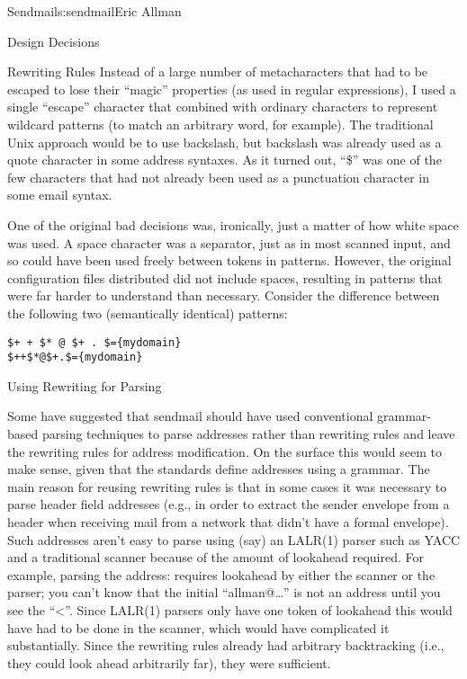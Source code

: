\begin{aosachapter}{Sendmail}{s:sendmail}{Eric Allman}
\begin{aosasect1}{Design Decisions}
\begin{aosasect2}{Rewriting Rules}
Instead of a large number of metacharacters that had to be escaped to
lose their ``magic'' properties (as used in regular expressions), I
used a single ``escape'' character that combined with ordinary
characters to represent wildcard patterns (to match an arbitrary word,
for example).  The traditional Unix approach would be to use
backslash, but backslash was already used as a quote character in some
address syntaxes. As it turned out, ``\$'' was one of the few
characters that had not already been used as a punctuation character
in some email syntax.

One of the original bad decisions was, ironically, just a matter of how white
space was used. A space character was a separator, just as in most
scanned input, and so could have been used freely between tokens in
patterns. However, the original configuration files distributed did
not include spaces, resulting in patterns that were far harder to
understand than necessary. Consider the difference between the
following two (semantically identical) patterns:

\begin{verbatim}
$+ + $* @ $+ . $={mydomain}
$++$*@$+.$={mydomain}
\end{verbatim}

\end{aosasect2}

\begin{aosasect2}{Using Rewriting for Parsing}

Some have suggested that sendmail should have used conventional
grammar-based parsing techniques to parse addresses rather than
rewriting rules and leave the rewriting rules for address modification.
On the surface this would seem to make sense, given
that the standards define addresses using a grammar.  The main reason
for reusing rewriting rules is that in some cases it was necessary to
parse header field addresses (e.g., in order to extract the sender
envelope from a header when receiving mail from a network that didn't
have a formal envelope). Such addresses aren't easy to parse using
(say) an LALR(1) parser such as YACC and a traditional scanner because
of the amount of lookahead required. For example, parsing the address:
 requires lookahead by
either the scanner or the parser; you can't know that the initial
``allman@\ldots'' is not an address until you see the
``{\textless}''.
Since LALR(1) parsers only have one token of lookahead
this would have had to be done in the scanner,
which would have complicated it substantially.
Since the rewriting rules already had arbitrary backtracking
(i.e., they could look ahead arbitrarily far),
they were sufficient.


\end{aosasect2}
\end{aosasect1}
\end{aosachapter}
